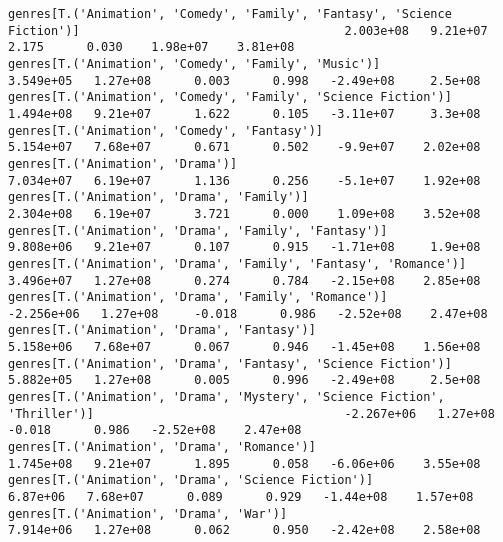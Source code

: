 \documentclass[11pt]{article}
\begin{document}
\begin{Verbatim}[commandchars=\\\{\}]
genres[T.('Animation', 'Comedy', 'Family', 'Fantasy', 'Science Fiction')]                                     2.003e+08   9.21e+07      2.175      0.030    1.98e+07    3.81e+08
genres[T.('Animation', 'Comedy', 'Family', 'Music')]                                                          3.549e+05   1.27e+08      0.003      0.998   -2.49e+08     2.5e+08
genres[T.('Animation', 'Comedy', 'Family', 'Science Fiction')]                                                1.494e+08   9.21e+07      1.622      0.105   -3.11e+07     3.3e+08
genres[T.('Animation', 'Comedy', 'Fantasy')]                                                                  5.154e+07   7.68e+07      0.671      0.502    -9.9e+07    2.02e+08
genres[T.('Animation', 'Drama')]                                                                              7.034e+07   6.19e+07      1.136      0.256    -5.1e+07    1.92e+08
genres[T.('Animation', 'Drama', 'Family')]                                                                    2.304e+08   6.19e+07      3.721      0.000    1.09e+08    3.52e+08
genres[T.('Animation', 'Drama', 'Family', 'Fantasy')]                                                         9.808e+06   9.21e+07      0.107      0.915   -1.71e+08     1.9e+08
genres[T.('Animation', 'Drama', 'Family', 'Fantasy', 'Romance')]                                              3.496e+07   1.27e+08      0.274      0.784   -2.15e+08    2.85e+08
genres[T.('Animation', 'Drama', 'Family', 'Romance')]                                                        -2.256e+06   1.27e+08     -0.018      0.986   -2.52e+08    2.47e+08
genres[T.('Animation', 'Drama', 'Fantasy')]                                                                   5.158e+06   7.68e+07      0.067      0.946   -1.45e+08    1.56e+08
genres[T.('Animation', 'Drama', 'Fantasy', 'Science Fiction')]                                                5.882e+05   1.27e+08      0.005      0.996   -2.49e+08     2.5e+08
genres[T.('Animation', 'Drama', 'Mystery', 'Science Fiction', 'Thriller')]                                   -2.267e+06   1.27e+08     -0.018      0.986   -2.52e+08    2.47e+08
genres[T.('Animation', 'Drama', 'Romance')]                                                                   1.745e+08   9.21e+07      1.895      0.058   -6.06e+06    3.55e+08
genres[T.('Animation', 'Drama', 'Science Fiction')]                                                            6.87e+06   7.68e+07      0.089      0.929   -1.44e+08    1.57e+08
genres[T.('Animation', 'Drama', 'War')]                                                                       7.914e+06   1.27e+08      0.062      0.950   -2.42e+08    2.58e+08

\end{Verbatim}
\end{document}
